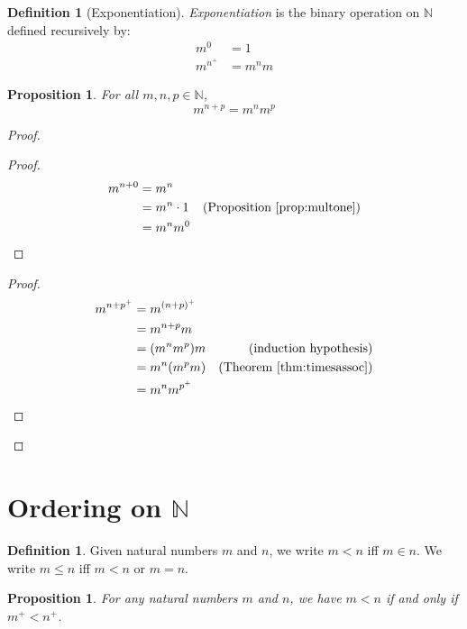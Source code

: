 \documentclass{book}
\let\qed\relax
\newtheorem{prop}[ax]{Proposition}
\theoremstyle{definition}
\newtheorem{df}[ax]{Definition}
\begin{document}
\begin{df}[Exponentiation]
\emph{Exponentiation} is the binary operation on $\mathbb{N}$ defined recursively by:
\begin{align*}
m^0 & = 1 \\
m^{n^+} & = m^n m
\end{align*}
\end{df}

\begin{prop}
For all $m,n,p \in \mathbb{N}$,
\[ m^{n+p} = m^n m^p \]
\end{prop}

\begin{proof}
\pf
{}
\begin{proof}
	\pf
	\begin{align*}
		m^{n+0} & = m^n \\
		& = m^n \cdot 1 & (\text{Proposition \ref{prop:multone}}) \\
		& = m^n m^0
	\end{align*}
\end{proof}
\begin{proof}
	\pf
	\begin{align*}
		m^{n+p^+} & = m^{(n+p)^+} \\
		& = m^{n+p} m \\
		& = (m^n m^p)m & (\text{induction hypothesis}) \\
		& = m^n (m^p m) & (\text{Theorem \ref{thm:timesassoc}}) \\
		& = m^n m^{p^+}
	\end{align*}
\end{proof}
\qed
\end{proof}

\section{Ordering on $\mathbb{N}$}

\begin{df}
Given natural numbers $m$ and $n$, we write $m < n$ iff $m \in n$. We write $m \leq n$ iff $m < n$ or $m = n$.
\end{df}

\begin{prop}
\label{prop:succltsucc}
For any natural numbers $m$ and $n$, we have $m < n$ if and only if $m^+ < n^+$.
\end{prop}
\end{document}
